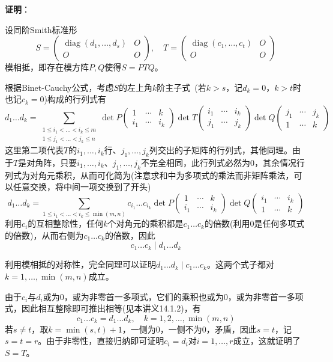 \documentclass[a4paper,UTF8,fontset=windows,AutoFakeBold]{ctexart}
\DeclareMathOperator{\diag}{diag}
\newcommand{\proo}[1]{{\vspace{5pt}\kaishu\noindent\textbf{证明}：\vspace{-3pt}
\begin{compactitem}
    \item[] #1
\end{compactitem}
}}
\begin{document}
\proo{
    设同阶Smith标准形
    $$S=\begin{pmatrix}\diag(d_1,\dots,d_s)&O\\O&O\end{pmatrix},\quad T=\begin{pmatrix}\diag(c_1,\dots,c_t)&O\\O&O\end{pmatrix}$$
    模相抵，即存在模方阵$P,Q$使得$S=PTQ$。

    根据Binet-Cauchy公式，考虑$S$的左上角$k$阶主子式\ (若$k>s$，记$d_k=0$，$k>t$时也记$c_k=0$)构成的行列式有
    $$d_1\dots d_k=\sum_{\substack{1\le i_1<\dots<i_k\le m\\1\le j_1<\dots<j_k\le n}}\det P\begin{pmatrix}1&\cdots&k\\i_1&\cdots&i_k\end{pmatrix}\det T\begin{pmatrix}i_1&\cdots&i_k\\j_1&\cdots&j_k\end{pmatrix}\det Q\begin{pmatrix}j_1&\cdots&j_k\\1&\cdots&k\end{pmatrix}$$
    这里第二项代表$T$的$i_1,\dots,i_k$行、$j_1,\dots,j_k$列交出的子矩阵的行列式，其他同理。由于$T$是对角阵，只要$i_1,\dots,i_k$、$j_1,\dots,j_k$不完全相同，此行列式必然为0，其余情况行列式为对角元乘积，从而可化简为(注意求和中为多项式的乘法而非矩阵乘法，可以任意交换，将中间一项交换到了开头)
    $$d_1\dots d_k=\sum_{1\le i_1<\dots<i_k\le \min(m,n)}c_{i_1}\dots c_{i_k}\det P\begin{pmatrix}1&\cdots&k\\i_1&\cdots&i_k\end{pmatrix}\det Q\begin{pmatrix}i_1&\cdots&i_k\\1&\cdots&k\end{pmatrix}$$
    利用$c_i$的互相整除性，任何$k$个对角元的乘积都是$c_1\dots c_k$的倍数(利用0是任何多项式的倍数)，从而右侧为$c_1\dots c_k$的倍数，因此
    $$c_1\dots c_k\mid d_1\dots d_k$$

    利用模相抵的对称性，完全同理可以证明$d_1\dots d_k\mid c_1\dots c_k$。这两个式子都对$k=1,\dots,\min(m,n)$成立。

    由于$c_i$与$d_i$或为0，或为非零首一多项式，它们的乘积也或为0，或为非零首一多项式，因此相互整除即可推出相等(见本讲义14.1.2)，有
    $$c_1\dots c_k=d_1\dots d_k,\quad k=1,2,\dots,\min(m,n)$$
    若$s\ne t$，取$k=\min(s,t)+1$，一侧为0，一侧不为0，矛盾，因此$s=t$，记$s=t=r$。由于非零性，直接归纳即可证明$c_i=d_i$对$i=1,\dots,r$成立，这就证明了$S=T$。
}
\end{document}

